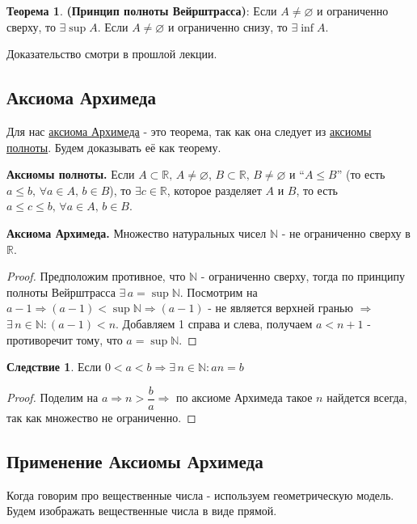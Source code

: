 \documentclass[12pt]{article}
\theoremstyle{definition}
\newtheorem{theorem}{Теорема}
\newtheorem{corollary}{Следствие}
\begin{document}

\begin{theorem}\textbf{(Принцип полноты Вейрштрасса)}:
	Если $A \neq \varnothing$ и ограниченно сверху, то $\exists \sup{A}$.
	Если $A \neq \varnothing$ и ограниченно снизу, то $\exists \inf{A}$.
\end{theorem}
Доказательство смотри в прошлой лекции.

\subsection*{Аксиома Архимеда} 

Для нас \uline{аксиома Архимеда} - это теорема, так как она следует из \uline{аксиомы полноты}. Будем доказывать её как теорему.

\textbf{Аксиомы полноты.} Если $A \subset \mathbb{R}, \, A \neq \varnothing$, $B \subset \mathbb{R}, \, B \neq \varnothing$ и ``$A \leq B$'' (то есть $a \leq b, \, \forall a \in A,\, b \in B$), то $\exists c \in \mathbb{R}$, которое разделяет $A$ и $B$, то есть $a \leq c \leq b, \, \forall a \in A,\, b \in B$.

\textbf{Аксиома Архимеда.}	Множество натуральных чисел $\mathbb{N}$ - не ограниченно сверху в $\mathbb{R}$.

\begin{proof}
	Предположим противное, что $\mathbb{N}$ - ограниченно сверху, тогда по принципу полноты Вейрштрасса $\exists \, a = \sup{\mathbb{N}}$. Посмотрим на $a-1 \Rightarrow (a-1) < \sup{\mathbb{N}} \Rightarrow (a-1)$ - не является верхней гранью $\Rightarrow$ \\
	$\exists \, n \in \mathbb{N} \colon (a-1) < n$. Добавляем 1 справа и слева, получаем $a < n+1$ - противоречит тому, что $a = \sup{\mathbb{N}}$.
\end{proof}

\begin{corollary}
	Если $0 < a < b \Rightarrow \exists \, n\in \mathbb{N} \colon an = b$
\end{corollary}
\begin{proof}
	Поделим на $a \Rightarrow n > \dfrac{b}{a} \Rightarrow$ по аксиоме Архимеда такое $n$ найдется всегда, так как множество не ограниченно.
\end{proof}

\subsection*{Применение Аксиомы Архимеда}
Когда говорим про вещественные числа - используем геометрическую модель. Будем изображать вещественные числа в виде прямой.
\end{document}
